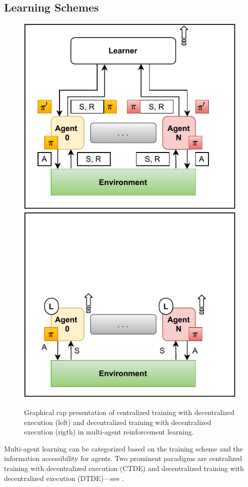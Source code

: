 \documentclass[sigconf]{acmart}
\begin{document}
\subsection{Learning Schemes}
\begin{figure}
  \centering
  \includegraphics[width=0.49\linewidth]{figures/learning-scheme-ctde.pdf}
  \includegraphics[width=0.49\linewidth]{figures/learning-scheme-dtde.pdf}
  \caption{Graphical rap presentation of centralized training with decentralized execution (left) and decentralized training with decentralized execution (rigth) in multi-agent reinforcement learning.}
  \label{fig:learning_paradigms}
\end{figure}
Multi-agent learning can be categorized based on the training scheme and the information accessibility for agents. 
Two prominent paradigms are centralized training with decentralized execution (CTDE) and decentralized training with decentralized execution (DTDE)---see .
\end{document}
